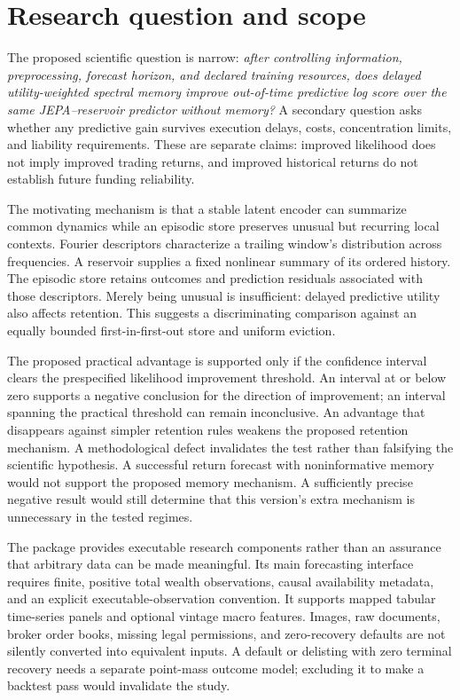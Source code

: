 \documentclass[11pt,a4paper]{article}
\begin{document}
\section{Research question and scope}

The proposed scientific question is narrow: \emph{after controlling information, preprocessing, forecast horizon, and declared training resources, does delayed utility-weighted spectral memory improve out-of-time predictive log score over the same JEPA--reservoir predictor without memory?} A secondary question asks whether any predictive gain survives execution delays, costs, concentration limits, and liability requirements. These are separate claims: improved likelihood does not imply improved trading returns, and improved historical returns do not establish future funding reliability.

The motivating mechanism is that a stable latent encoder can summarize common dynamics while an episodic store preserves unusual but recurring local contexts. Fourier descriptors characterize a trailing window's distribution across frequencies. A reservoir supplies a fixed nonlinear summary of its ordered history. The episodic store retains outcomes and prediction residuals associated with those descriptors. Merely being unusual is insufficient: delayed predictive utility also affects retention. This suggests a discriminating comparison against an equally bounded first-in-first-out store and uniform eviction.

The proposed practical advantage is supported only if the confidence interval clears the prespecified likelihood improvement threshold. An interval at or below zero supports a negative conclusion for the direction of improvement; an interval spanning the practical threshold can remain inconclusive. An advantage that disappears against simpler retention rules weakens the proposed retention mechanism. A methodological defect invalidates the test rather than falsifying the scientific hypothesis. A successful return forecast with noninformative memory would not support the proposed memory mechanism. A sufficiently precise negative result would still determine that this version's extra mechanism is unnecessary in the tested regimes.

The package provides executable research components rather than an assurance that arbitrary data can be made meaningful. Its main forecasting interface requires finite, positive total wealth observations, causal availability metadata, and an explicit executable-observation convention. It supports mapped tabular time-series panels and optional vintage macro features. Images, raw documents, broker order books, missing legal permissions, and zero-recovery defaults are not silently converted into equivalent inputs. A default or delisting with zero terminal recovery needs a separate point-mass outcome model; excluding it to make a backtest pass would invalidate the study.
\end{document}
